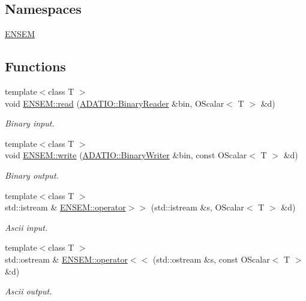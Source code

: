 \subsection*{Namespaces}
\begin{DoxyCompactItemize}
\item 
 \mbox{\hyperlink{namespaceENSEM}{E\+N\+S\+EM}}
\end{DoxyCompactItemize}
\subsection*{Functions}
\begin{DoxyCompactItemize}
\item 
{\footnotesize template$<$class T $>$ }\\void \mbox{\hyperlink{group__obsscalar_ga5b22786975bbf72d834fd044913a417b}{E\+N\+S\+E\+M\+::read}} (\mbox{\hyperlink{classADATIO_1_1BinaryReader}{A\+D\+A\+T\+I\+O\+::\+Binary\+Reader}} \&bin, O\+Scalar$<$ T $>$ \&d)
\begin{DoxyCompactList}\small\item\em Binary input. \end{DoxyCompactList}\item 
{\footnotesize template$<$class T $>$ }\\void \mbox{\hyperlink{group__obsscalar_ga921d40c8afba8e09044b5c679c71b495}{E\+N\+S\+E\+M\+::write}} (\mbox{\hyperlink{classADATIO_1_1BinaryWriter}{A\+D\+A\+T\+I\+O\+::\+Binary\+Writer}} \&bin, const O\+Scalar$<$ T $>$ \&d)
\begin{DoxyCompactList}\small\item\em Binary output. \end{DoxyCompactList}\item 
{\footnotesize template$<$class T $>$ }\\std\+::istream \& \mbox{\hyperlink{group__obsscalar_ga8ceaf63a1afb58830666610d78d86809}{E\+N\+S\+E\+M\+::operator$>$$>$}} (std\+::istream \&s, O\+Scalar$<$ T $>$ \&d)
\begin{DoxyCompactList}\small\item\em Ascii input. \end{DoxyCompactList}\item 
{\footnotesize template$<$class T $>$ }\\std\+::ostream \& \mbox{\hyperlink{group__obsscalar_ga7ac0c3b6cd38466c57c199a30f7795cd}{E\+N\+S\+E\+M\+::operator$<$$<$}} (std\+::ostream \&s, const O\+Scalar$<$ T $>$ \&d)
\begin{DoxyCompactList}\small\item\em Ascii output. \end{DoxyCompactList}\item 

\end{DoxyCompactItemize}
